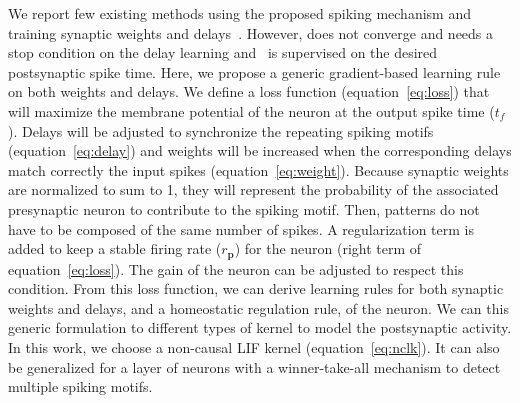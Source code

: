 \documentclass[11pt]{article}
\newcommand{\timev}{t} %
\newcommand{\channel}{\mathbf{p}} %
\newcommand{\firerank}{f}
\begin{document}
\begin{multicols}{2}

We report few existing methods using the proposed spiking mechanism and training synaptic weights and delays~\cite{nadafian_bio-plausible_2020, zhang_supervised_2020}. However, \cite{nadafian_bio-plausible_2020} does not converge and needs a stop condition on the delay learning and~\cite{zhang_supervised_2020} is supervised on the desired postsynaptic spike time. 
Here, we propose a generic gradient-based learning rule on both weights and delays. 
We define a loss function (equation~\eqref{eq:loss}) that will maximize the membrane potential of the neuron at the output spike time ($\timev_\firerank$). Delays will be adjusted to synchronize the repeating spiking motifs (equation~\eqref{eq:delay}) and weights will be increased when the corresponding delays match correctly the input spikes (equation~\eqref{eq:weight}). Because synaptic weights are normalized to sum to 1, they will represent the probability of the associated presynaptic neuron to contribute to the spiking motif. Then, patterns do not have to be composed of the same number of spikes. A regularization term is added to keep a stable firing rate ($r_\channel$) for the neuron (right term of equation~\eqref{eq:loss}). The gain of the neuron can be adjusted to respect this condition. From this loss function, we can derive learning rules for both synaptic weights and delays, and a homeostatic regulation rule, of the neuron. We can this generic formulation to different types of kernel to model the postsynaptic activity. In this work, we choose a non-causal LIF kernel (equation~\eqref{eq:nclk}). It can also be generalized for a layer of neurons with a winner-take-all mechanism to detect multiple spiking motifs.


\end{multicols}
\end{document}
